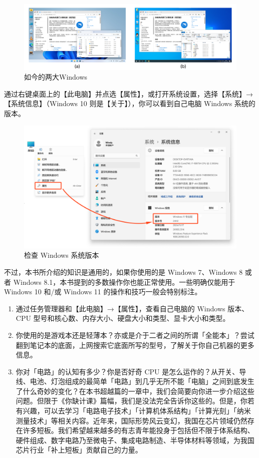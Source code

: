 \begin{figure}[htb!]
  \centering
  \includegraphics[width=.9\textwidth]{assets/basic/Win_11_and_10.pdf}
  \caption{如今的两大Windows}
  \label{fig:Win_11_and_10}
\end{figure}

通过右键桌面上的【此电脑】并点选【属性】，或打开系统设置，选择【系统】→【系统信息】（Windows 10 则是【关于】），你可以看到自己电脑 Windows 系统的版本。

\begin{figure}[htb!]
  \centering
  \includegraphics[width=.7\textwidth]{assets/basic/Check_Windows_version.png}
  \caption{检查 Windows 系统版本}
  \label{fig:check-windows-version}
\end{figure}

不过，本书所介绍的知识是通用的，如果你使用的是 Windows 7、Windows 8 或者 Windows 8.1，本书提到的多数操作你也能正常使用。一些明确仅能用于 Windows 10 和/或 Windows 11 的操作和技巧一般会特别标注。

\practice

\begin{enumerate}
  \item 通过任务管理器和【此电脑】→【属性】，查看自己电脑的 Windows 版本、CPU 型号和核心数、内存大小、硬盘大小和类型、显卡大小和类型。
  \item 你使用的是游戏本还是轻薄本？亦或是介于二者之间的所谓「全能本」？尝试翻到笔记本的底面，上网搜索它底面所写的型号，了解关于你自己机器的更多信息。
  \item 你对「电路」的认知有多少？你是否好奇 CPU 是怎么运作的？从开关、导线、电池、灯泡组成的最简单「电路」到几乎无所不能「电脑」之间到底发生了什么奇妙的变化？在本书超越篇的一章中，我们会简要向你进一步介绍这些问题。但限于《你缺计课》篇幅，我们是没法完全告诉你这些的。但是，你若有兴趣，可以去学习「电路电子技术」「计算机体系结构」「计算光刻」「纳米测量技术」等相关内容。近年来，国际形势风云变幻，我国在芯片领域仍然存在许多短板。我们希望越来越多的有志青年能投身于包括但不限于体系结构、硬件组成、数字电路乃至微电子、集成电路制造、半导体材料等领域，为我国芯片行业「补上短板」贡献自己的力量。
\end{enumerate}
